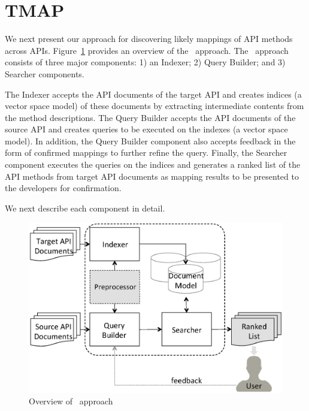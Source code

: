 \section{TMAP}
\label{sec:approach}

We next present our approach for discovering 
likely mappings of API methods  across APIs. 
Figure~\ref{fig:approachOverview} provides an overview of the \tool\ approach.
The \tool\ approach consists of three major components: 1) an Indexer; 2) Query Builder; and 3) Searcher components.


The Indexer accepts the API documents of the target API
and creates indices (a vector space model) of these documents 
by extracting intermediate contents from the method descriptions. 
The Query Builder accepts the API documents of the source API
and creates queries to be executed on the indexes (a vector space model).
In addition, the Query Builder component also accepts feedback
in the form of confirmed mappings to further refine the query. 
Finally, the Searcher component executes the queries on the indices and 
generates a ranked list of the API methods from target API documents as
mapping results to be presented to the developers for confirmation.

We next describe each component in detail.


\begin{figure}
	\begin{center}
		\includegraphics[scale=0.45]{ApproahOverview.eps}
		\caption{\label{fig:approachOverview} Overview of \tool\ approach}
	\end{center}
\end{figure}


